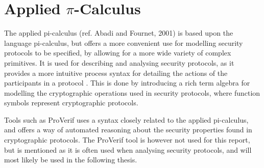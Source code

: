 \section{Applied $\pi$-Calculus}

The applied pi-calculus (ref. Abadi and Fournet, 2001) is based upon the language pi-calculus, but offers a more convenient use for modelling security protocols to be specified, by allowing for a more wide variety of complex primitives. It is used for describing and analysing security protocols, as it provides a more intuitive process syntax for detailing the actions of the participants in a protocol \autocite{AplliedPiCalsulus2010}. This is done by introducing a rich term algebra for modelling the cryptographic operations used in security protocols, where function symbols represent cryptographic protocols. 

Tools such as ProVerif \autocite{ProVerif} uses a syntax closely related to the applied pi-calculus, and offers a way of automated reasoning about the security properties found in cryptographic protocols. The ProVerif tool is however not used for this report, but is mentioned as it is often used when analysing security protocols, and will most likely be used in the following thesis.\\

